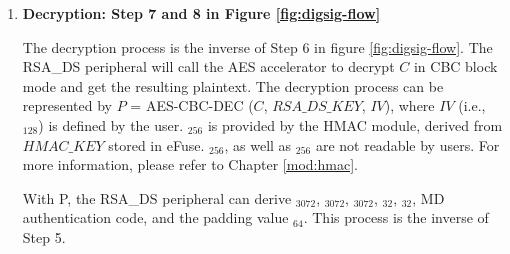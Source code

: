 \documentclass[main\_\_EN.tex]{subfiles}
\begin{document}
\begin{enumerate}  

    \item {\bfseries Decryption: Step 7 and 8 in Figure \ref{fig:digsig-flow}}
    
        
        The decryption process is the inverse of Step 6 in figure \ref{fig:digsig-flow}. The RSA\_DS peripheral will call the AES accelerator to decrypt \begin{math}C\end{math} in CBC block mode and get the resulting plaintext. The decryption process can be represented by \begin{math}P\end{math} = AES-CBC-DEC (\begin{math}C\end{math}, \begin{math}RSA\_DS\_KEY\end{math}, \begin{math}IV\end{math}), where \begin{math}IV\end{math} (i.e., \begin{math}[IV]_{128}\end{math}) is defined by the user. \begin{math}[RSA\_DS\_KEY]_{256}\end{math} is provided by the HMAC module, derived from \begin{math}HMAC\_KEY\end{math} stored in eFuse. \begin{math}[RSA\_DS\_KEY]_{256}\end{math}, as well as \begin{math}[HMAC\_KEY]_{256}\end{math} are not readable by users. For more information, please refer to Chapter \ref{mod:hmac}\textit{}.

        With P, the RSA\_DS peripheral can derive \begin{math}[Y]_{3072}\end{math}, \begin{math}[M]_{3072}\end{math}, \begin{math}[\overline{r}]_{3072}\end{math}, \begin{math}[M^{\prime}]_{32}\end{math}, \begin{math}[L]_{32}\end{math}, MD authentication code, and the padding value \begin{math}[\beta]_{64} \end{math}. This process is the inverse of Step 5.
        

\end{enumerate}
\end{document}

